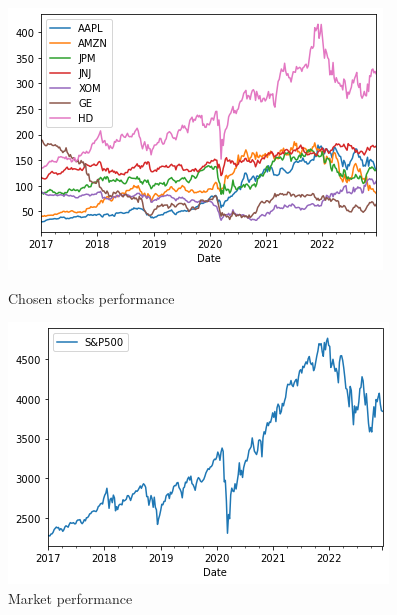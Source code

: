 \documentclass[13pt]{article}
\theoremstyle{definition}
\theoremstyle{remark}
\begin{document}
\begin{figure}[!htbp]
\begin{minipage}{0.5\textwidth}
        \centering
        \includegraphics[width=0.9\linewidth,height =0.7\linewidth, angle=0]{stocks performance.png}
        \caption{Chosen stocks performance}
         \label{fig:stocks performance}
\end{minipage}\hfill
\begin{minipage}{0.5\textwidth}
        \centering
        \includegraphics[width=0.9\linewidth,height =0.7\linewidth, angle=0]{market performance.png}
        \caption{Market performance}
         \label{fig:market performance}\end{minipage}
         \label{fig:stocks and marker performance}
         \end{figure}
\end{document}
